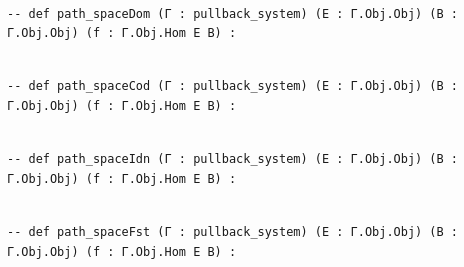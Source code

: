 \documentclass{book}
\theoremstyle{definition}
\newcounter{lcounter}
\begin{document}
\begin{center}
\begin{tcolorbox}[width=5in,colback={white},title={\begin{center}\texttt{Lean \thelcounter} \addtocounter{lcounter}{1}  \end{center}},colbacktitle=Blue,coltitle=black]
\begin{verbatim}

-- def path_spaceDom (Γ : pullback_system) (E : Γ.Obj.Obj) (B : Γ.Obj.Obj) (f : Γ.Obj.Hom E B) :

\end{verbatim}
\end{tcolorbox}
\end{center}

\begin{center}
\begin{tcolorbox}[width=5in,colback={white},title={\begin{center}\texttt{Lean \thelcounter} \addtocounter{lcounter}{1}  \end{center}},colbacktitle=Blue,coltitle=black]
\begin{verbatim}

-- def path_spaceCod (Γ : pullback_system) (E : Γ.Obj.Obj) (B : Γ.Obj.Obj) (f : Γ.Obj.Hom E B) :

\end{verbatim}
\end{tcolorbox}
\end{center}

\begin{center}
\begin{tcolorbox}[width=5in,colback={white},title={\begin{center}\texttt{Lean \thelcounter} \addtocounter{lcounter}{1}  \end{center}},colbacktitle=Blue,coltitle=black]
\begin{verbatim}

-- def path_spaceIdn (Γ : pullback_system) (E : Γ.Obj.Obj) (B : Γ.Obj.Obj) (f : Γ.Obj.Hom E B) :

\end{verbatim}
\end{tcolorbox}
\end{center}

\begin{center}
\begin{tcolorbox}[width=5in,colback={white},title={\begin{center}\texttt{Lean \thelcounter} \addtocounter{lcounter}{1}  \end{center}},colbacktitle=Blue,coltitle=black]
\begin{verbatim}

-- def path_spaceFst (Γ : pullback_system) (E : Γ.Obj.Obj) (B : Γ.Obj.Obj) (f : Γ.Obj.Hom E B) :

\end{verbatim}
\end{tcolorbox}
\end{center}
\end{document}
